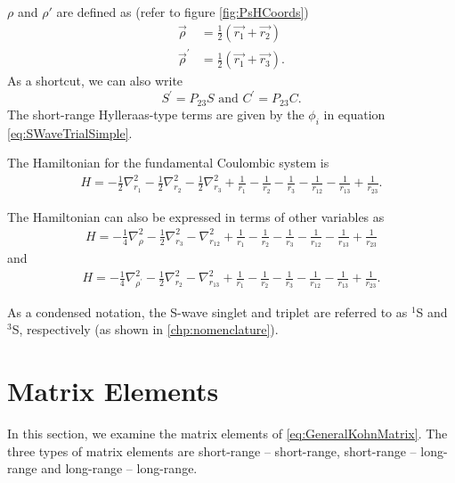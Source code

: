 \documentclass[Dissertation.tex]{subfiles}
\begin{document}
$\rho$ and $\rho'$ are defined as (refer to figure \ref{fig:PsHCoords})
\begin{subequations}
\begin{align}
\vec{\rho} &= \frac{1}{2}\left(\vec{r_1} + \vec{r_2}\right) \label{eq:RhoDef}\\
\vec{\rho}^\prime &= \frac{1}{2}\left(\vec{r_1} + \vec{r_3}\right) \label{eq:RhopDef}.
\end{align}
\end{subequations}
As a shortcut, we can also write
\begin{equation}
S^\prime = P_{23} S \text{ and } C^\prime = P_{23} C.
\label{eq:SCprime}
\end{equation}
The short-range Hylleraas-type terms are given by the $\phi_i$ in equation \ref{eq:SWaveTrialSimple}. 

The Hamiltonian for the fundamental Coulombic system is
\begin{align}
\label{eq:Hamiltonian1}
H = -\frac{1}{2} \nabla_{r_1}^2 - \frac{1}{2} \nabla_{r_2}^2 - \frac{1}{2} \nabla_{r_3}^2 + \frac{1}{r_1} - \frac{1}{r_2} - \frac{1}{r_3} - \frac{1}{r_{12}} -\frac {1}{r_{13}} + \frac{1}{r_{23}}.
\end{align}

\noindent The Hamiltonian can also be expressed in terms of other variables as
\begin{align}
H = -\frac{1}{4} \nabla_{\rho}^2 - \frac{1}{2} \nabla_{r_3}^2 - \nabla_{r_{12}}^2 + \frac{1}{r_1} - \frac{1}{r_2} - \frac{1}{r_3} - \frac{1}{r_{12}} - \frac{1}{r_{13}} + \frac{1}{r_{23}}
\label{eq:Hamiltonian2Dup}
\end{align}
and
\begin{align}
H = -\frac{1}{4} \nabla_{\rho^\prime}^2 - \frac{1}{2} \nabla_{r_2}^2 - \nabla_{r_{13}}^2 + \frac{1}{r_1} - \frac{1}{r_2} - \frac{1}{r_3} - \frac{1}{r_{12}} - \frac{1}{r_{13}} + \frac{1}{r_{23}}.
\label{eq:Hamiltonian3}
\end{align}

As a condensed notation, the S-wave singlet and triplet are referred to as $^1$S and $^3$S, respectively (as shown in \cref{chp:nomenclature}).



\section{Matrix Elements}
In this section, we examine the matrix elements of \cref{eq:GeneralKohnMatrix}. The three types of matrix elements are short-range -- short-range, short-range -- long-range and long-range -- long-range.
\end{document}
